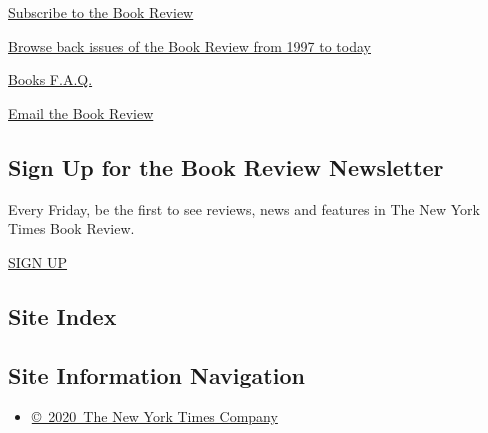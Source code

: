 \href{https://homedelivery.nytimes3xbfgragh.onion/HDS/BookReviewHome.do?mode=BookReviewHome\&ref=review}{Subscribe
to the Book Review}

\href{https://www.nytimes3xbfgragh.onion/2014/07/29/books/review/the-new-york-times-book-review-back-issues.html}{Browse
back issues of the Book Review from 1997 to today}

\href{https://www.nytimes3xbfgragh.onion/membercenter/faq/books.html?ref=review}{Books
F.A.Q.}

\href{mailto:books@NYTimes.com}{Email the Book Review}

\hypertarget{sign-up-for-the-book-review-newsletter}{%
\subsection{Sign Up for the Book Review
Newsletter}\label{sign-up-for-the-book-review-newsletter}}

Every Friday, be the first to see reviews, news and features in The New
York Times Book Review.

\href{/newsletters/signup/BK}{SIGN UP}

\hypertarget{site-index}{%
\subsection{Site Index}\label{site-index}}

\hypertarget{site-information-navigation}{%
\subsection{Site Information
Navigation}\label{site-information-navigation}}

\begin{itemize}
\tightlist
\item
  \href{https://help.nytimes3xbfgragh.onion/hc/en-us/articles/115014792127-Copyright-notice}{©~2020~The
  New York Times Company}
\end{itemize}

